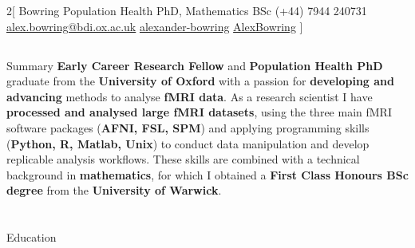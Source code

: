 \documentclass{my_cv}
\begin{document}
\begin{multicols}{2}[
        {Bowring}%
        {Population Health PhD, Mathematics BSc}%
        {(+44) 7944 240731}%
        {\href{mailto:alex.bowring@bdi.ox.ac.uk}{alex.bowring@bdi.ox.ac.uk}}%
        {\href{https://www.linkedin.com/in/alexander-bowring/}{alexander-bowring}}%
        {\href{https://github.com/AlexBowring/}{AlexBowring}}
]

\end{multicols}

\vspace{-1.7cm}
\begin{tcolorbox}[colback=white,colframe=cyan,width=\dimexpr\textwidth+12mm\relax,enlarge left by=-6mm]
\section{\faStickyNote}{Summary}
\textbf{Early Career Research Fellow} and \textbf{Population Health PhD} graduate from the \textbf{University of Oxford} with a passion for \textbf{developing and advancing} methods to analyse \textbf{fMRI data}. As a research scientist I have \textbf{processed and analysed large fMRI datasets}, using the three main fMRI software packages (\textbf{AFNI, FSL, SPM}) and applying programming skills (\textbf{Python, R, Matlab, Unix}) to conduct data manipulation and develop replicable analysis workflows. These skills are combined with a technical background in \textbf{mathematics}, for which I obtained a \textbf{First Class Honours BSc degree} from the \textbf{University of Warwick}. 
  
\end{tcolorbox}


\section{\faGraduationCap}{Education}
\end{document}
